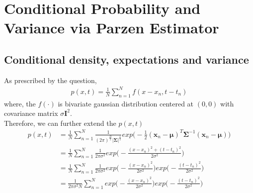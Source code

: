 \documentclass[11pt,a4paper]{article}
\newcommand{\htab}{\hspace*{0.63cm}}
\newcommand{\bs}[1]{\boldsymbol{#1}}
\newcommand{\bmu}{\boldsymbol{\mu}}
\newcommand{\half}{\frac{1}{2}}
\begin{document}
\section{Conditional Probability and Variance via Parzen Estimator}
{ %
\subsection{Conditional density, expectations and variance}
\newcommand{\sumn}{\sum_{n=1}^{N}}
\newcommand{\summ}{\sum_{m=1}^{N}}
\newcommand{\kx}{k(x,x_{n})}
\newcommand{\kt}{k(t,t_{n})}
\newcommand{\expt}{exp \Big( -  \frac{(t-t_{n})^{2}}{2\sigma^{2}} \Big)}
\newcommand{\expx}{exp \Big( -  \frac{(x-x_{n})^{2}}{2\sigma^{2}} \Big)}
\newcommand{\expxm}{exp \Big( -  \frac{(x-x_{m})^{2}}{2\sigma^{2}} \Big)}
\newcommand{\gcoeff}{\frac{1}{ (2\pi)^{\half} \sigma}}
\newcommand{\gcoeffinv}{(2\pi)^{\half} \sigma}
\newcommand{\gcoeffinvsqu}{2\pi \sigma^{2}}
\newcommand{\aveN}{\frac{1}{N} \sum_{n=1}^{N}}
\newcommand{\intt}{\int_{t}}
\newcommand{\intx}{\int_{x}}
\newcommand{\E}{\mathbb{E}}
\newcommand{\Et}{\mathbb{E}^{2}}
\newcommand{\var}{\mathbb{VAR}}
\newcommand{\bSigma}{\bs{\Sigma}}
\newcommand{\ptgx}{\frac{1}{\gcoeffinv N}  \sumn  \Bigg( \kx \cdot \expt \Bigg)}
\htab As prescribed by the question,
\begin{align}
    p(x,t) = \frac{1}{N} \sumn f(x-x_{n}, t - t_{n})
    \end{align}
\htab where, the $f(\cdot)$ is bivariate gaussian distribution centered at $(0,0)$ 
    with covariance matrix $\sigma\bs{I}^{2}$. \\
\htab Therefore, we can further extend the $p(x,t)$
\begin{align}
    p(x,t) &=  \frac{1}{N} \sumn \frac{1}{(2\pi)^{\frac{D}{2}} |\bSigma|^{\half}}
        exp \Big( - \half (\bs{x}_{n} - \bmu)^{T} \bSigma^{-1} (\bs{x}_{n} - \bmu) \Big) \label{8:px01} \\
    &= \frac{1}{N} \sumn \frac{1}{2\pi \sigma^{2}} 
        exp \Big( - \frac{(x-x_{n})^{2} + (t-t_{n})^{2}}{2\sigma^{2}} \Big) \label{8:px02} \\
        &= \frac{1}{N} \sumn \frac{1}{2\pi \sigma^{2}} 
        exp \Big( - \frac{(x-x_{n})^{2}} {2\sigma^{2}} \Big)
        exp \Big( -  \frac{(t-t_{n})^{2}}{2\sigma^{2}} \Big) \label{8:px03} \\
        &= \frac{1}{\gcoeffinvsqu N} \sumn  
        exp \Big( - \frac{(x-x_{n})^{2}} {2\sigma^{2}} \Big)
        exp \Big( -  \frac{(t-t_{n})^{2}}{2\sigma^{2}} \Big) \label{8:pxtresult}

\end{align}}
\end{document}
